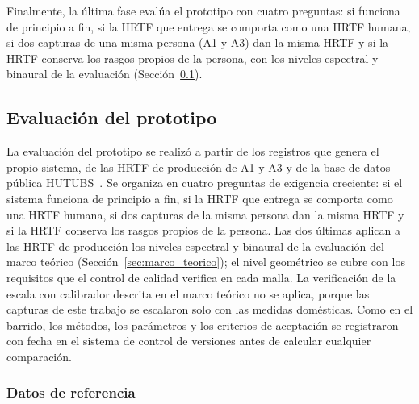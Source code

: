 
Finalmente, la última fase evalúa el prototipo con cuatro preguntas: si funciona de principio a fin, si la HRTF que entrega se comporta como una HRTF humana, si dos capturas de una misma persona (A1 y A3) dan la misma HRTF y si la HRTF conserva los rasgos propios de la persona, con los niveles espectral y binaural de la evaluación (Sección~\ref{subsec:evaluacion}).


\subsection{Evaluación del prototipo}
\label{subsec:evaluacion}

La evaluación del prototipo se realizó a partir de los registros que genera el propio sistema, de las HRTF de producción de A1 y A3 y de la base de datos pública HUTUBS~\cite{Brinkmann2019}. Se organiza en cuatro preguntas de exigencia creciente: si el sistema funciona de principio a fin, si la HRTF que entrega se comporta como una HRTF humana, si dos capturas de la misma persona dan la misma HRTF y si la HRTF conserva los rasgos propios de la persona. Las dos últimas aplican a las HRTF de producción los niveles espectral y binaural de la evaluación del marco teórico (Sección~\ref{sec:marco_teorico}); el nivel geométrico se cubre con los requisitos que el control de calidad verifica en cada malla. La verificación de la escala con calibrador descrita en el marco teórico no se aplica, porque las capturas de este trabajo se escalaron solo con las medidas domésticas. Como en el barrido, los métodos, los parámetros y los criterios de aceptación se registraron con fecha en el sistema de control de versiones antes de calcular cualquier comparación.

\subsubsection{Datos de referencia}

